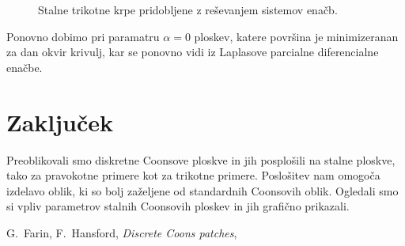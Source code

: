 \documentclass[a4paper,12pt]{article}
\begin{document}
\begin{figure}[ht!]
   \centering
   
   \caption{Stalne trikotne krpe pridobljene z reševanjem sistemov enačb.}
\label{fig:trikotne}
\end{figure}

Ponovno dobimo pri paramatru $\alpha = 0$ ploskev, 
katere površina je minimizeranan za dan okvir krivulj, kar se ponovno vidi iz 
Laplasove parcialne diferencialne enačbe.

\section{Zaključek}

Preoblikovali smo diskretne Coonsove ploskve in jih posplošili na stalne
ploskve, tako za pravokotne primere kot za trikotne primere. Poslošitev nam omogoča
izdelavo oblik, ki so bolj zaželjene od standardnih Coonsovih oblik. Ogledali smo 
si vpliv parametrov stalnih Coonsovih ploskev in jih grafično prikazali.

\newpage

\begin{thebibliography}{99}
   G.~Farin, F.~Hansford, \emph{Discrete Coons patches}, 
\end{thebibliography}
\end{document}
